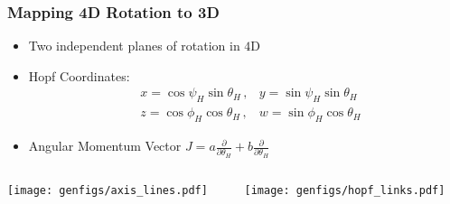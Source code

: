 \documentclass{beamer}
\begin{document}
\begin{frame}[squeeze]
  \frametitle{Mapping 4D Rotation to 3D}
  \begin{itemize}
    \item Two independent planes of rotation in $4$D 
    \item Hopf Coordinates: 
      \begin{align*}
        &x=\cos\psi_H\sin \theta_H\,,&y=\sin \psi_H\sin \theta_H\\
        &z=\cos \phi_H\cos \theta_H\,,&w=\sin \phi_H\cos \theta_H
      \end{align*}
    \item Angular Momentum Vector $J = a\frac\partial{\partial\theta_H} + b\frac\partial{\partial\theta_H}$
  \end{itemize}
  \begin{columns}[t]
    \begin{column}{0.5\paperwidth}
      \texttt{[image: genfigs/axis\_lines.pdf]}
    \end{column}
    \begin{column}{0.5\paperwidth}
      \texttt{[image: genfigs/hopf\_links.pdf]}
    \end{column}
  \end{columns}
\end{frame}




\end{document}
